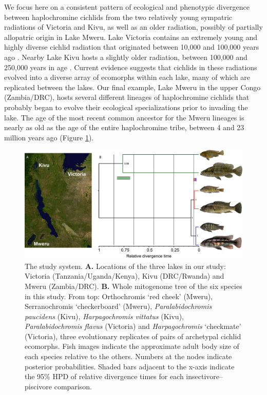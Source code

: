 We focus here on a consistent pattern of ecological and phenotypic divergence between haplochromine cichlids from the two relatively young sympatric radiations of Victoria and Kivu, as well as an older radiation, possibly of partially allopatric origin in Lake Mweru. Lake Victoria contains an extremely young and highly diverse cichlid radiation that originated between 10,000 and 100,000 years ago \cite{seehausen2002patterns, genner2007age, salzburger2014ecology}. Nearby Lake Kivu hosts a slightly older radiation, between 100,000 and 250,000 years in age \cite{genner2007age, bezault2011population, salzburger2014ecology}. Current evidence suggests that cichlids in these radiations evolved into a diverse array of ecomorphs within each lake, many of which are replicated between the lakes. Our final example, Lake Mweru in the upper Congo (Zambia/DRC), hosts several different lineages of haplochromine cichlids that probably began to evolve their ecological specializations prior to invading the lake. The age of the most recent common ancestor for the Mweru lineages is nearly as old as the age of the entire haplochromine tribe, between 4 and 23 million years ago \cite{genner2007age, wagner2012ecological, friedman2013molecular} (Figure \ref{UL_fig1}).

\begin{figure}
\includegraphics[width=\textwidth]{uLakes/figures/fig1}
\caption{The study system. \textbf{A.} Locations of the three lakes in our study: Victoria (Tanzania/Uganda/Kenya), Kivu (DRC/Rwanda) and Mweru (Zambia/DRC). \textbf{B.} Whole mitogenome tree of the six species in this study. From top: Orthochromis `red cheek' (Mweru), Serranochromis `checkerboard' (Mweru), {\em Paralabidochromis paucidens} (Kivu), {\em Harpagochromis vittatus} (Kivu), {\em Paralabidochromis flavus} (Victoria) and {\em Harpagochromis} `checkmate' (Victoria), three evolutionary replicates of pairs of archetypal cichlid ecomorphs. Fish images indicate the approximate adult body size of each species relative to the others. Numbers at the nodes indicate posterior probabilities. Shaded bars adjacent to the x-axis indicate the 95\% HPD of relative divergence times for each insectivore–piscivore comparison.}
\label{UL_fig1}
\end{figure}

